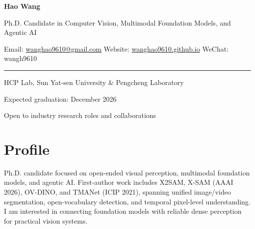 \documentclass[10pt,letterpaper]{article}
\begin{document}
\begin{minipage}{\textwidth}
    \vspace{8pt}
    \centering
    {\Huge\bfseries\color{ink} Hao Wang}\par
    \vspace{4pt}
    {\large\color{accentdark} Ph.D. Candidate in Computer Vision, Multimodal Foundation Models, and Agentic AI}\par
    \vspace{6pt}
    {\small
      Email: \href{mailto:wanghao9610@gmail.com}{wanghao9610@gmail.com}
      \quad\textbar\quad
      Website: \href{https://wanghao9610.github.io/}{wanghao9610.github.io}
      \quad\textbar\quad
      WeChat: wangh9610
    }\par
    \vspace{7pt}
    {\color{rule}\rule{\linewidth}{0.5pt}}\par
    \vspace{5pt}
    \noindent
    \begin{minipage}[t]{0.62\textwidth}
      \RaggedRight\small HCP Lab, Sun Yat-sen University \& Pengcheng Laboratory
    \end{minipage}
    \hfill
    \begin{minipage}[t]{0.34\textwidth}
      \RaggedLeft\small Expected graduation: December 2026
    \end{minipage}\par
    \vspace{2pt}
    {\small\RaggedRight Open to industry research roles and collaborations\par}
    \vspace{3pt}
\end{minipage}

\section{Profile}
Ph.D. candidate focused on open-ended visual perception, multimodal foundation models, and agentic AI. First-author work includes X2SAM, X-SAM (AAAI 2026), OV-DINO, and TMANet (ICIP 2021), spanning unified image/video segmentation, open-vocabulary detection, and temporal pixel-level understanding. I am interested in connecting foundation models with reliable dense perception for practical vision systems.
\end{document}
